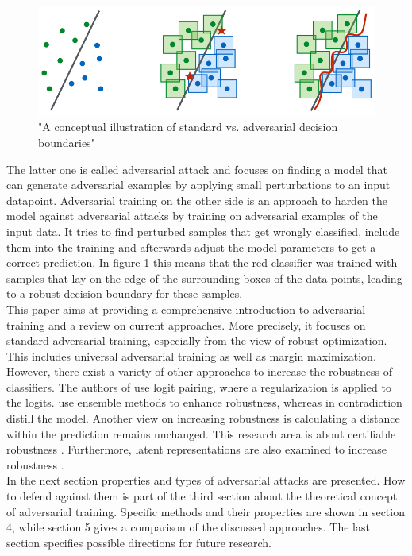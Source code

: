 \documentclass{article}
\begin{document}
\begin{figure}[ht]
  \centering
  \vspace{-0.6cm}
  \includegraphics[scale=0.27]{decision_boundaries.png}
  \vspace{-0.45cm}
  \caption{"A conceptual illustration of standard vs. adversarial decision boundaries" \cite{b2}} 
  \label{fig2: standard and adversarial decision boundaries}
  \vspace{-0.2cm}
\end{figure}
\vspace{-0.07cm}
The latter one is called adversarial attack and focuses on finding a model that can generate adversarial examples by applying small perturbations to an input datapoint. Adversarial training on the other side is an approach to harden the model against adversarial attacks by training on adversarial examples of the input data. It tries to find perturbed samples that get wrongly classified, include them into the training and afterwards adjust the model parameters to get a correct prediction. In figure \ref{fig2: standard and adversarial decision boundaries} this means that the red classifier was trained with samples that lay on the edge of the surrounding boxes of the data points, leading to a robust decision boundary for these samples. \\
This paper aims at providing a comprehensive introduction to adversarial training and a review on current approaches. More precisely, it focuses on standard adversarial training, especially from the view of robust optimization. This includes universal adversarial training as well as margin maximization. However, there exist a variety of other approaches to increase the robustness of classifiers. The authors of \cite{b19, b20} use logit pairing, where a regularization is applied to the logits. \cite{b23} use ensemble methods to enhance robustness, whereas \cite{b21, b22} in contradiction distill the model. Another view on increasing robustness is calculating a distance within the prediction remains unchanged. This research area is about certifiable robustness \cite{b30}. Furthermore, latent representations are also examined to increase robustness \cite{b31}. \\
In the next section properties and types of adversarial attacks are presented. How to defend against them is part of the third section about the theoretical concept of adversarial training. Specific methods and their properties are shown in section 4, while section 5 gives a comparison of the discussed approaches. The last section specifies possible directions for future research.
\end{document}
